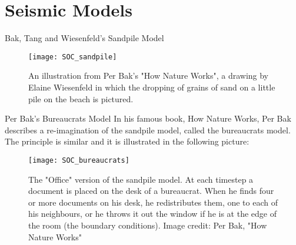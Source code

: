 \section{Seismic Models}


\begin{frame}{Bak, Tang and Wiesenfeld's Sandpile Model}
\begin{figure}[!h]
  \centering
  \texttt{[image: SOC\_sandpile]}
  \caption{An illustration from Per Bak's "How Nature Works", a drawing by Elaine Wiesenfeld in which the dropping of grains of sand on a little pile on the beach is pictured.}
  \label{fig:driverBlock}
\end{figure}
\end{frame}

\begin{comment}
\begin{frame}
The model is described as a two-dimensional sandpile, a cellular automaton comprising of interactions of an integer variable $z$ (number of sand grains in a site) with it's nearest neighbours. A grid of sites is created, with boundary conditions $z=0$. The sites are updated at random by dropping sand on them, and when $z>K$ (a threshold value) redistribution occurs:
\begin{align}
&z(x,y) \to z(x,y)-4, \\
&z(x\pm 1,y) \to z(x \pm 1,y)+1, \\
&z(x,y\pm 1) \to z(x,y\pm 1)+1.
\end{align}
The site is initiated with random values for each site $z>>K$ and it evolves until it stops $z<K$. \par
Simulations show that the distribution of cluster sizes and time scales follow power-law distributions.\par 
The self-organized critical state of minimally stable clusters is very robust on all length scales and they create fluctuations on all time scales.
\end{frame}
\end{comment}


\begin{frame}{Per Bak's Bureaucrats Model}
In his famous book, How Nature Works, Per Bak describes a re-imagination of the sandpile model, called the bureaucrats model. The principle is similar and it is illustrated in the following picture:

\begin{figure}[!h]
  \centering
  \texttt{[image: SOC\_bureaucrats]}
  \caption{The "Office" version of the sandpile model. At each timestep a document is placed on the desk of a bureaucrat. When he finds four or more documents on his desk, he redistributes them, one to each of his neighbours, or he throws it out the window if he is at the edge of the room (the boundary conditions). Image credit: Per Bak, "How Nature Works"}
  \label{fig:bureaucrats}
\end{figure}
\end{frame}


